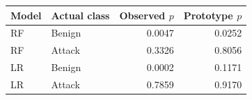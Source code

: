 \centering\footnotesize
\begin{tabular}{@{}llrr@{}}
\toprule
Model & Actual class & Observed $p$ & Prototype $p$\\\midrule
RF & Benign & 0.0047 & 0.0252\\
RF & Attack & 0.3326 & 0.8056\\
LR & Benign & 0.0002 & 0.1171\\
LR & Attack & 0.7859 & 0.9170\\
\bottomrule
\end{tabular}
